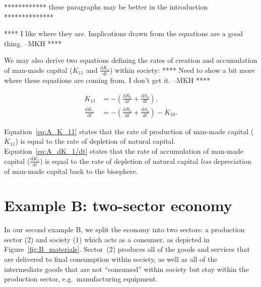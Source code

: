 ************ these paragraphs may be better in the introduction **************

**** I like where they are. Implications drawn from the equations are a good thing. --MKH ****

We may also derive two equations defining the rates of creation and accumulation
of man-made capital ($\dot{K}_{11}$ and $\frac{\mathrm{d}K_{1}}{\mathrm{d}t}$) within
society: **** Need to show a bit more where these equations are coming from. 
I don't get it. --MKH ****

\begin{align}
	\label{eq:A_K_11}
	\dot{K}_{11}									&
	= - \left(\frac{\mathrm{d}R_0}{\mathrm{d}t}		
	+	\frac{\mathrm{d}S_0}{\mathrm{d}t}\right),	\\
	\label{eq:A_dK_1/dt}
	\frac{\mathrm{d}K_{1}}{\mathrm{d}t}				&
	= - \left(\frac{\mathrm{d}R_0}{\mathrm{d}t}		
	+	\frac{\mathrm{d}S_0}{\mathrm{d}t}\right)
	- \dot{K}_{10}.
\end{align}

Equation~\ref{eq:A_K_11} states that the rate of production of man-made capital
($\dot{K}_{11}$) is equal to the rate of depletion of natural capital. 
Equation~\ref{eq:A_dK_1/dt} states that the rate of accumulation of man-made capital
($\frac{\mathrm{d}K_{1}}{\mathrm{d}t}$) is equal to the rate of depletion of natural
capital \emph{less} depreciation of man-made capital back to the biosphere.

\section{Example B: two-sector economy} %
\label{sec:B_materials}

In our second example B, we split the economy into two sectors: 
a production sector (2) and society (1) which acts as a consumer, 
as depicted in Figure~\ref{fig:B_materials}. 
Sector~(2) produces all of the goods and services 
that are delivered to final consumption within society, 
as well as all of the intermediate goods that are not ``consumed'' 
within society but stay within the production sector, e.g.\ manufacturing equipment.

